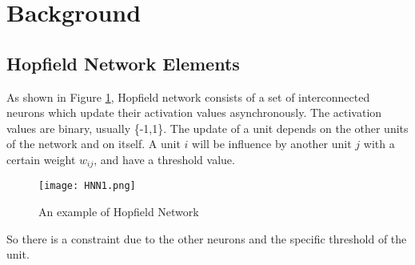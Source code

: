 \section{Background}
\subsection{Hopfield Network Elements}
As shown in Figure \ref{fg:HNN1}, Hopfield network consists of a set of interconnected neurons which update their activation values asynchronously. The activation values are binary, usually \{-1,1\}. The update of a unit depends on the other units of the network and on itself. A unit $i$ will be influence by another unit $j$ with a certain weight $w_{ij}$, and have a threshold value\cite{bib:info-theory}.\\

\begin{figure}[h]
\centering
\texttt{[image: HNN1.png]}
\caption{An example of Hopfield Network}
\label{fg:HNN1}
\end{figure}

So there is a constraint due to the other neurons and the specific threshold of the unit.\\

